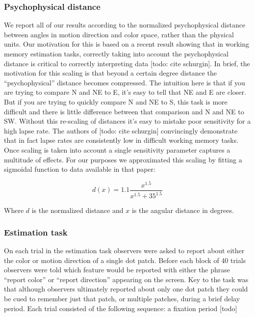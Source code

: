 \subsubsection{Psychophysical distance}

We report all of our results according to the normalized psychophysical distance between angles in motion direction and color space, rather than the physical units. Our motivation for this is based on a recent result showing that in working memory estimation tasks, correctly taking into account the psychophysical distance is critical to correctly interpreting data [todo: cite schurgin]. In brief, the motivation for this scaling is that beyond a certain degree distance the ``psychophysical'' distance becomes compressed. The intuition here is that if you are trying to compare N and NE to E, it's easy to tell that NE and E are closer. But if you are trying to quickly compare N and NE to S, this task is more difficult and there is little difference between that comparison and N and NE to SW. Without this re-scaling of distances it's easy to mistake poor sensitivity for a high lapse rate. The authors of [todo: cite schurgin] convincingly demonstrate that in fact lapse rates are consistently low in difficult working memory tasks. Once scaling is taken into account a single sensitivity parameter captures a multitude of effects. For our purposes we approximated this scaling by fitting a sigmoidal function to data available in that paper: 

\begin{equation}
    d(x) = 1.1\frac{x^{1.5}}{x^{1.5}+35^{1.5}}
    \label{eqn:c5psycho}
\end{equation}

Where $d$ is the normalized distance and $x$ is the angular distance in degrees. 

\subsubsection{Estimation task}

On each trial in the estimation task observers were asked to report about either the color or motion direction of a single dot patch. Before each block of 40 trials observers were told which feature would be reported with either the phrase ``report color'' or ``report direction'' appearing on the screen. Key to the task was that although observers ultimately reported about only one dot patch they could be cued to remember just that patch, or multiple patches, during a brief delay period. Each trial consisted of the following sequence: a fixation period [todo]

